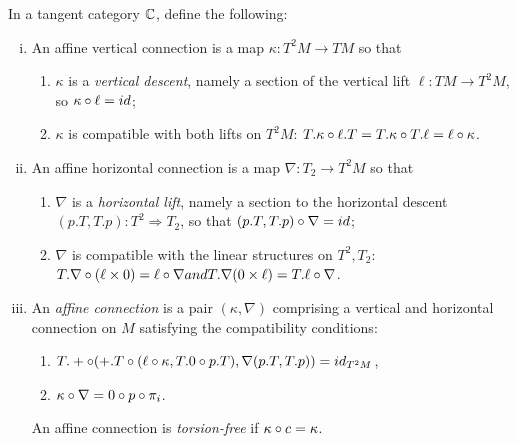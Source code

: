 
\begin{definition}
    In a tangent category $\mathbb{C}$, define the following:
    \begin{enumerate}[(i)]
        \item An affine vertical connection is a map $\kappa:T^2M \to TM$ so that 
        \begin{enumerate}
            \item $\kappa$ is a \emph{vertical descent}, namely a section of the vertical lift $\ell:TM \to T^2M$, so $\kappa \circ \ell = id$;
            \item $\kappa$ is compatible with both lifts on $T^2M$: $T.\kappa \circ \ell.T = T.\kappa \circ T.\ell = \ell\circ \kappa$.
        \end{enumerate}
        \item An affine horizontal connection is a map $\nabla:T_2 \to T^2M$ so that
        \begin{enumerate}
            \item $\nabla$ is a \emph{horizontal lift}, namely a section to the horizontal descent $(p.T, T.p): T^2 \Rightarrow T_2$, so that $(p.T,T.p) \circ \nabla = id$;
            \item $\nabla$ is compatible with the linear structures on $T^2, T_2$:$ T.\nabla\o (\ell\x 0) \linebreak = \ell \o \nabla and T.\nabla(0\x \ell) = T.\ell \o \nabla$.
        \end{enumerate}
        \item An \emph{affine connection} is a pair $(\kappa, \nabla)$ comprising a vertical and horizontal connection on $M$ satisfying the compatibility conditions: 
        \begin{enumerate}
            \item $T.+ \circ (+.T \circ (\ell \circ \kappa, T.0 \circ p.T), \nabla(p.T, T.p)) = id_{T^2M}$, 
            \item $\kappa \circ \nabla = 0 \circ p \circ \pi_i$.
        \end{enumerate}
        An affine connection is \emph{torsion-free} if $\kappa \circ c = \kappa$.
    \end{enumerate}
\end{definition}

